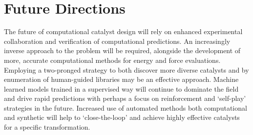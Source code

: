 \documentclass[../main.tex]{subfiles}
\begin{document}


\section{Future Directions}

The future of computational catalyst design will rely on enhanced experimental collaboration and verification of computational predictions. An increasingly inverse approach to the problem will be required, alongside the development of more, accurate computational methods for energy and force evaluations. Employing a two-pronged strategy to both discover more diverse catalysts and by enumeration of human-guided libraries may be an effective approach. Machine learned models trained in a supervised way will continue to dominate the field and drive rapid predictions with perhaps a focus on reinforcement and `self-play' strategies in the future. Increased use of automated methods both computational and synthetic will help to `close-the-loop' and achieve highly effective catalysts for a specific transformation.




\clearpage
\end{document}
